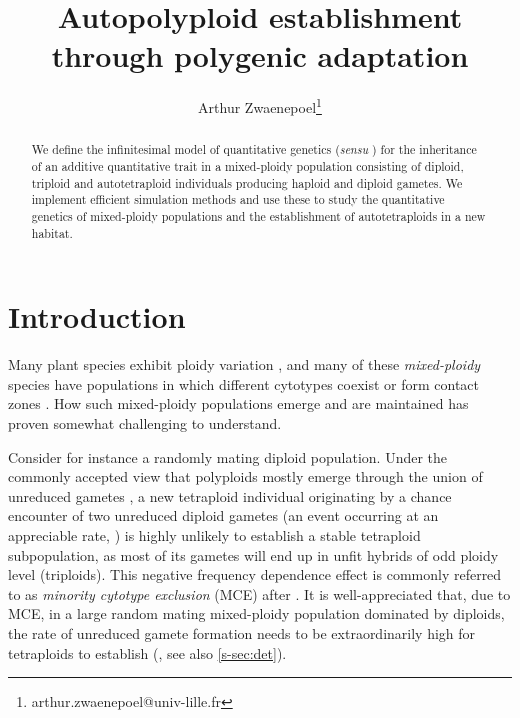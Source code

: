 \documentclass[11pt,a4paper]{article}
\begin{document}
\title{Autopolyploid establishment through polygenic adaptation}
\author[1]{Arthur Zwaenepoel\thanks{arthur.zwaenepoel@univ-lille.fr}}
\date{\vspace{-5ex}}
\maketitle
\begin{abstract}
We define the infinitesimal model of quantitative genetics (\textit{sensu}
\cite{barton2017}) for the inheritance of an additive quantitative trait in a
mixed-ploidy population consisting of diploid, triploid and autotetraploid
individuals producing haploid and diploid gametes.
We implement efficient simulation methods and use these to study the
quantitative genetics of mixed-ploidy populations and the establishment of
autotetraploids in a new habitat.
\end{abstract}

\section*{Introduction}

Many plant species exhibit ploidy variation
\citep{levin2002,soltis2007,rice2015}, and many of these \textit{mixed-ploidy}
species have populations in which different cytotypes coexist or form contact
zones \citep{kolar2017}.
How such mixed-ploidy populations emerge and are maintained has proven somewhat
challenging to understand.

Consider for instance a randomly mating diploid population.
Under the commonly accepted view that polyploids mostly emerge through the
union of unreduced gametes \citep{herben2016,kreiner2017b}, a new tetraploid
individual originating by a chance encounter of two unreduced diploid gametes
(an event occurring at an appreciable rate, \citep{kreiner2017}) is highly
unlikely to establish a stable tetraploid subpopulation, as most of its gametes
will end up in unfit hybrids of odd ploidy level (triploids).
This negative frequency dependence effect is commonly referred to as
\textit{minority cytotype exclusion} (MCE) after \cite{levin1975}.
It is well-appreciated that, due to MCE, in a large random mating mixed-ploidy
population dominated by diploids, the rate of unreduced gamete formation needs
to be extraordinarily high for tetraploids to establish (\cite{felber1997}, see
also \cref{s-sec:det}).
\end{document}
